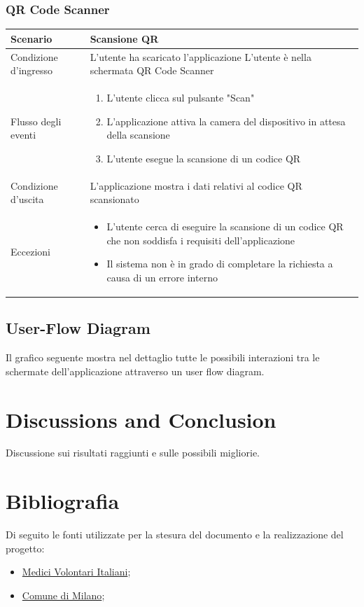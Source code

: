 \documentclass[12pt,a4paper,twoside,openright,titlepage]{book}
\begin{document}
\subsection{QR Code Scanner}
\begin{table}[H]
\centering
\begin{tabular}{|p{4cm}|p{10cm}|}
\hline
Scenario & Scansione QR \\
\hline
Condizione d'ingresso & L'utente ha scaricato l'applicazione\newline
L'utente è nella schermata QR Code Scanner\\
\hline
Flusso degli eventi & 
\begin{enumerate}
\item L'utente clicca sul pulsante "Scan"
\item L'applicazione attiva la camera del dispositivo in attesa della scansione
\item L'utente esegue la scansione di un codice QR
\end{enumerate}\\
\hline
Condizione d'uscita & L'applicazione mostra i dati relativi al codice QR scansionato\\
\hline
Eccezioni & 
\begin{itemize}
\item L'utente cerca di eseguire la scansione di un codice QR che non soddisfa i requisiti dell'applicazione
\item Il sistema non è in grado di completare la richiesta a causa di un errore interno
\end{itemize} \\
\hline
\end{tabular}
\end{table}

\section{User-Flow Diagram}
Il grafico seguente mostra nel dettaglio tutte le possibili interazioni tra le schermate dell'applicazione attraverso un user flow diagram.


\chapter{Discussions and Conclusion}
Discussione sui risultati raggiunti e sulle possibili migliorie.

\chapter{Bibliografia}
Di seguito le fonti utilizzate per la stesura del documento e la realizzazione del progetto:
\begin{itemize}
\item \href{https://www.medicivolontaritaliani.org/}{Medici Volontari Italiani};
\item \href{https://www.comune.milano.it/aree-tematiche/servizi-sociali/raccolta-dati-personali-per-interventi-di-emergenza}{Comune di Milano};
\end{itemize}
\end{document}
